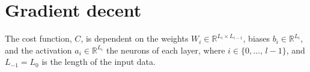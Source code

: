 \section*{Gradient decent}
The cost function, $C$, is dependent on the weights $W_i \in  \mathbb{R}^{L_i \times L_{i-1}} $, biases $b_i \in \mathbb{R}^{L_i}$, and the activation $a_i\in \mathbb{R}^{L_i}$ the neurons of each layer, where $ i \in \{0, ..., \,l-1\}$, and $L_{-1} = L_0$ is the length of the input data.
